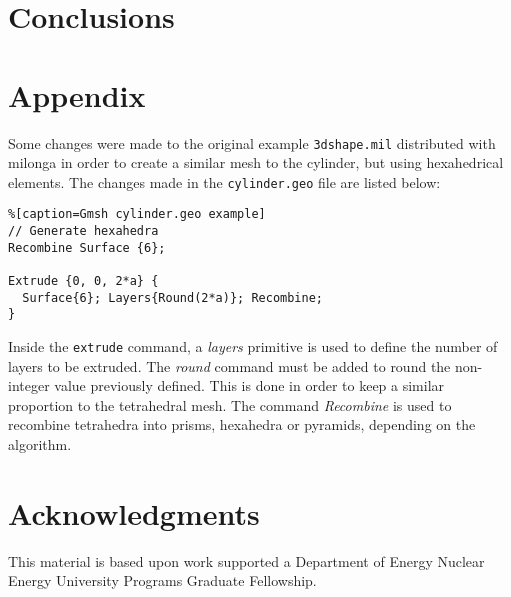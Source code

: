 \documentclass{anstrans}
\begin{document}
\section{Conclusions}

\appendix
\section{Appendix}
\label{Appendix}
Some changes were made to the original example \texttt{3dshape.mil} distributed
with milonga in order to create a similar mesh to the cylinder, but using
hexahedrical elements. The changes made in the \texttt{cylinder.geo} file
are listed below:

\begin{lstlisting}%[caption=Gmsh cylinder.geo example]
// Generate hexahedra
Recombine Surface {6};

Extrude {0, 0, 2*a} {
  Surface{6}; Layers{Round(2*a)}; Recombine;
}
\end{lstlisting}

Inside the \texttt{extrude} command, a \textit{layers} primitive is used to
define the number of layers to be extruded. The \textit{round} command must
be added to round the non-integer value previously defined. This is done
in order to keep a similar proportion to the tetrahedral mesh. The
command \textit{Recombine} is used to recombine tetrahedra into prisms,
hexahedra or pyramids, depending on the algorithm.

\section{Acknowledgments}
This material is based upon work supported a Department of Energy Nuclear
Energy University Programs Graduate Fellowship.


\end{document}
